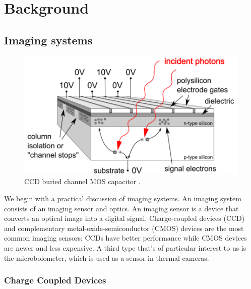 \section{Background}\label{sec:background}
\localtableofcontents
\subsection{Imaging systems}\label{subsec:imaging-systems}
\begin{figure}[!htbp]
	\includegraphics[width=\linewidth,keepaspectratio]{figures/background/bccd.png}
	\caption{CCD buried channel MOS capacitor \cite{finaltestguideline}.}
	\label{fig:mos-cap}
\end{figure}

We begin with a practical discussion of imaging systems.
%
An imaging system consists of an imaging sensor and optics. 
%
An imaging sensor is a device that converts an optical image into a digital signal.
%
Charge-coupled devices (CCD) and complementary metal-oxide-semiconductor (CMOS) devices are the most common imaging sensors; CCDs have better performance while CMOS devices are newer and less expensive.
%
A third type that's of particular interest to us is the microbolometer, which is used as a sensor in thermal cameras.

\subsubsection{Charge Coupled Devices}

